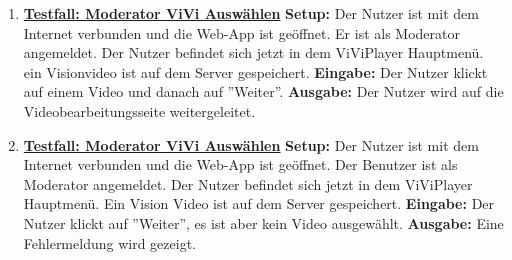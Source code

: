 \begin{enumerate}
	\item \underline{\textbf{Testfall: Moderator ViVi Auswählen}} \linebreak
	\textbf{Setup:} Der Nutzer ist mit dem Internet verbunden und die Web-App ist geöffnet. Er ist als Moderator angemeldet. Der Nutzer befindet sich jetzt in dem ViViPlayer Hauptmenü. ein Visionvideo ist auf dem Server gespeichert. \linebreak
	\textbf{Eingabe:} Der Nutzer klickt auf einem Video und danach auf ''Weiter''. \linebreak
	\textbf{Ausgabe:} Der Nutzer wird auf die Videobearbeitungsseite weitergeleitet. 
	
	
	
	\item \underline{\textbf{Testfall: Moderator ViVi Auswählen}} \linebreak
	\textbf{Setup:} Der Nutzer ist mit dem Internet verbunden und die Web-App ist geöffnet. Der Benutzer ist als Moderator angemeldet. Der Nutzer befindet sich jetzt in dem ViViPlayer Hauptmenü. Ein Vision Video ist auf dem Server gespeichert.\linebreak
	\textbf{Eingabe:} Der Nutzer klickt auf ''Weiter'', es ist aber kein Video ausgewählt. \linebreak
	\textbf{Ausgabe:} Eine Fehlermeldung wird gezeigt.
	

\end{enumerate}
